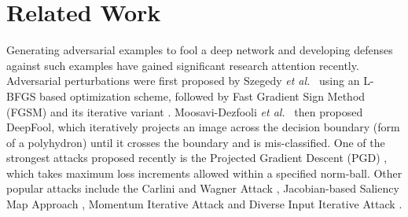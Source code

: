 \documentclass[10pt,twocolumn,letterpaper]{article}
\begin{document}
\section{Related Work}
\label{sec:related-work}

Generating adversarial examples to fool a deep network and developing defenses against such examples have gained significant research attention recently. Adversarial perturbations were first proposed by Szegedy \textit{et al.}\ \cite{szegedy2013intriguing} using an L-BFGS based optimization scheme, followed by Fast Gradient Sign Method (FGSM) \cite{43405} and its iterative variant \cite{kurakin2016adversarial}. Moosavi-Dezfooli \textit{et al.}\ \cite{moosavi2016deepfool} then proposed DeepFool, which iteratively projects an image across the decision boundary (form of a polyhydron) until it crosses the boundary and is mis-classified. One of the strongest attacks proposed recently is the Projected Gradient Descent (PGD) \cite{madry2017towards}, which takes maximum loss increments allowed within a specified  norm-ball. Other popular attacks include the Carlini and Wagner Attack \cite{carlini2017towards}, Jacobian-based Saliency Map Approach \cite{papernot2016limitations}, Momentum Iterative Attack \cite{dong2018boosting} and Diverse Input Iterative Attack \cite{xie2018improving}.
\end{document}
